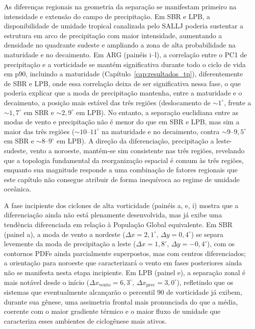 As diferenças regionais na geometria da separação se manifestam primeiro na intensidade e extensão do campo de precipitação. Em SBR e LPB, a disponibilidade de umidade tropical canalizada pelo SALLJ \citep{reboita2026meteorology} poderia sustentar a estrutura em arco de precipitação com maior intensidade, aumentando a densidade no quadrante sudeste e ampliando a zona de alta probabilidade na maturidade e no decaimento. Em ARG (painéis i--l), a correlação entre o PC1 de precipitação e a vorticidade se mantém significativa durante todo o ciclo de vida em p90, incluindo a maturidade (Capítulo~\ref{cap:resultados_tp}), diferentemente de SBR e LPB, onde essa correlação deixa de ser significativa nessa fase, o que poderia explicar que a moda de precipitação mantenha, entre a maturidade e o decaimento, a posição mais estável das três regiões (deslocamento de ${\sim}1^{\circ}$, frente a ${\sim}1{,}7^{\circ}$ em SBR e ${\sim}2{,}9^{\circ}$ em LPB). No entanto, a separação euclidiana entre as modas de vento e precipitação não é menor do que em SBR e LPB, mas sim a maior das três regiões (${\sim}10$--$11^{\circ}$ na maturidade e no decaimento, contra ${\sim}9$--$9{,}5^{\circ}$ em SBR e ${\sim}8$--$9^{\circ}$ em LPB). A direção da diferenciação, precipitação a leste-sudeste, vento a noroeste, mantém-se sim consistente nas três regiões, revelando que a topologia fundamental da reorganização espacial é comum às três regiões, enquanto sua magnitude responde a uma combinação de fatores regionais que este capítulo não consegue atribuir de forma inequívoca ao regime de umidade oceânica.

A fase incipiente dos ciclones de alta vorticidade (painéis a, e, i) mostra que a diferenciação ainda não está plenamente desenvolvida, mas já exibe uma tendência diferenciada em relação à População Global equivalente. Em SBR (painel a), a moda de vento a nordeste ($\Delta x = 2{,}1^{\circ}$, $\Delta y = 0{,}4^{\circ}$) se separa levemente da moda de precipitação a leste ($\Delta x = 1{,}8^{\circ}$, $\Delta y = -0{,}4^{\circ}$), com os contornos PDFe ainda parcialmente superpostos, mas com centros diferenciados; a orientação para noroeste que caracterizará o vento em fases posteriores ainda não se manifesta nesta etapa incipiente. Em LPB (painel e), a separação zonal é mais notável desde o início ($\Delta x_{\text{vento}} = 6{,}3^{\circ}$, $\Delta x_{\text{prec}} = 3{,}0^{\circ}$), refletindo que os sistemas que eventualmente alcançarão o percentil 90 de vorticidade já exibem, durante sua gênese, uma assimetria frontal mais pronunciada do que a média, coerente com o maior gradiente térmico e o maior fluxo de umidade que caracteriza esses ambientes de ciclogênese mais ativos.

